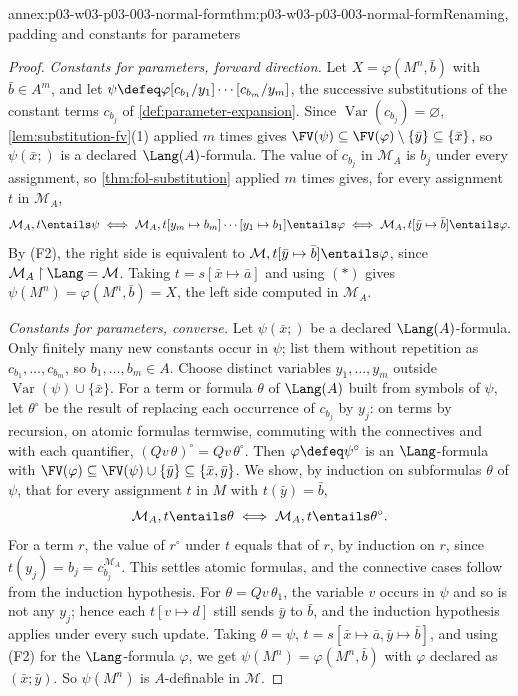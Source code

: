 \begin{annexitem}{annex:p03-w03-p03-003-normal-form}{thm:p03-w03-p03-003-normal-form}{Renaming, padding and constants for parameters}
\begin{proof}
\emph{Constants for parameters, forward direction.}  Let
\(X=\varphi(M^n,\bar b)\) with \(\bar b\in A^m\), and let
\(\psi\defeq\varphi[c_{b_1}/y_1]\cdots[c_{b_m}/y_m]\), the successive
substitutions of the constant terms \(c_{b_j}\) of
\cref{def:parameter-expansion}.  Since
\(\operatorname{Var}(c_{b_j})=\varnothing\), \cref{lem:substitution-fv}(1)
applied \(m\) times gives \(\FV(\psi)\subseteq\FV(\varphi)\setminus
\{\bar y\}\subseteq\{\bar x\}\), so \(\psi(\bar x;)\) is a declared
\(\Lang(A)\)-formula.  The value of \(c_{b_j}\) in \(\mathcal M_A\) is
\(b_j\) under every assignment, so \cref{thm:fol-substitution} applied \(m\)
times gives, for every assignment \(t\) in \(\mathcal M_A\),
\[
 \mathcal M_A,t\entails\psi\iff
 \mathcal M_A,t[y_m\mapsto b_m]\cdots[y_1\mapsto b_1]\entails\varphi
 \iff\mathcal M_A,t[\bar y\mapsto\bar b]\entails\varphi .
\]
By (F2), the right side is equivalent to
\(\mathcal M,t[\bar y\mapsto\bar b]\entails\varphi\), since
\(\mathcal M_A\mathbin{\upharpoonright}\Lang=\mathcal M\).  Taking
\(t=s[\bar x\mapsto\bar a]\) and using \((\ast)\) gives
\(\psi(M^n)=\varphi(M^n,\bar b)=X\), the left side computed in
\(\mathcal M_A\).

\emph{Constants for parameters, converse.}  Let \(\psi(\bar x;)\) be a
declared \(\Lang(A)\)-formula.  Only finitely many new constants occur in
\(\psi\); list them without repetition as \(c_{b_1},\ldots,c_{b_m}\), so
\(b_1,\ldots,b_m\in A\).  Choose distinct variables \(y_1,\ldots,y_m\)
outside \(\operatorname{Var}(\psi)\cup\{\bar x\}\).  For a term or formula
\(\theta\) of \(\Lang(A)\) built from symbols of \(\psi\), let
\(\theta^\circ\) be the result of replacing each occurrence of \(c_{b_j}\) by
\(y_j\): on terms by recursion, on atomic formulas termwise, commuting with
the connectives and with each quantifier, \((Qv\,\theta)^\circ=Qv\,
\theta^\circ\).  Then \(\varphi\defeq\psi^\circ\) is an \(\Lang\)-formula
with \(\FV(\varphi)\subseteq\FV(\psi)\cup\{\bar y\}\subseteq\{\bar x,\bar
y\}\).  We show, by induction on subformulas \(\theta\) of \(\psi\), that
for every assignment \(t\) in \(M\) with \(t(\bar y)=\bar b\),
\[
 \mathcal M_A,t\entails\theta\iff\mathcal M_A,t\entails\theta^\circ .
\]
For a term \(r\), the value of \(r^\circ\) under \(t\) equals that of \(r\),
by induction on \(r\), since \(t(y_j)=b_j=c_{b_j}^{\mathcal M_A}\).  This
settles atomic formulas, and the connective cases follow from the induction
hypothesis.  For \(\theta=Qv\,\theta_1\), the variable \(v\) occurs in
\(\psi\) and so is not any \(y_j\); hence each \(t[v\mapsto d]\) still sends
\(\bar y\) to \(\bar b\), and the induction hypothesis applies under every
such update.  Taking \(\theta=\psi\), \(t=s[\bar x\mapsto\bar a,\bar
y\mapsto\bar b]\), and using (F2) for the \(\Lang\)-formula \(\varphi\), we
get \(\psi(M^n)=\varphi(M^n,\bar b)\) with \(\varphi\) declared as
\((\bar x;\bar y)\).  So \(\psi(M^n)\) is \(A\)-definable in \(\mathcal M\).
\end{proof}
\end{annexitem}


